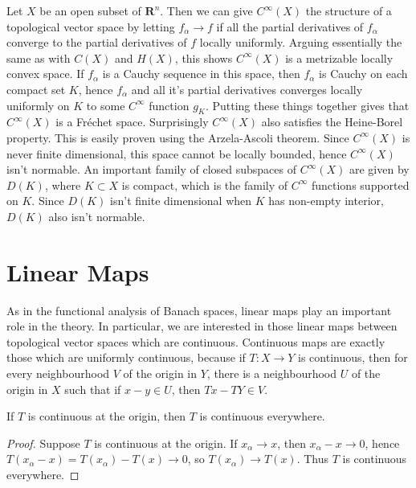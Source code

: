 \begin{example}
    Let $X$ be an open subset of $\mathbf{R}^n$. Then we can give $C^\infty(X)$ the structure of a topological vector space by letting $f_\alpha \to f$ if all the partial derivatives of $f_\alpha$ converge to the partial derivatives of $f$ locally uniformly. Arguing essentially the same as with $C(X)$ and $H(X)$, this shows $C^\infty(X)$ is a metrizable locally convex space. If $f_\alpha$ is a Cauchy sequence in this space, then $f_\alpha$ is Cauchy on each compact set $K$, hence $f_\alpha$ and all it's partial derivatives converges locally uniformly on $K$ to some $C^\infty$ function $g_K$. Putting these things together gives that $C^\infty(X)$ is a Fr\'{e}chet space. Surprisingly $C^\infty(X)$ also satisfies the Heine-Borel property. This is easily proven using the Arzela-Ascoli theorem. Since $C^\infty(X)$ is never finite dimensional, this space cannot be locally bounded, hence $C^\infty(X)$ isn't normable. An important family of closed subspaces of $C^\infty(X)$ are given by $D(K)$, where $K \subset X$ is compact, which is the family of $C^\infty$ functions supported on $K$. Since $D(K)$ isn't finite dimensional when $K$ has non-empty interior, $D(K)$ also isn't normable.
\end{example}



\section{Linear Maps}

As in the functional analysis of Banach spaces, linear maps play an important role in the theory. In particular, we are interested in those linear maps between topological vector spaces which are continuous. Continuous maps are exactly those which are uniformly continuous, because if $T: X \to Y$ is continuous, then for every neighbourhood $V$ of the origin in $Y$, there is a neighbourhood $U$ of the origin in $X$ such that if $x - y \in U$, then $Tx - TY \in V$.

\begin{lemma}
    If $T$ is continuous at the origin, then $T$ is continuous everywhere.
\end{lemma}
\begin{proof}
    Suppose $T$ is continuous at the origin. If $x_\alpha \to x$, then $x_\alpha - x \to 0$, hence $T(x_\alpha - x) = T(x_\alpha) - T(x) \to 0$, so $T(x_\alpha) \to T(x)$. Thus $T$ is continuous everywhere.
\end{proof}


